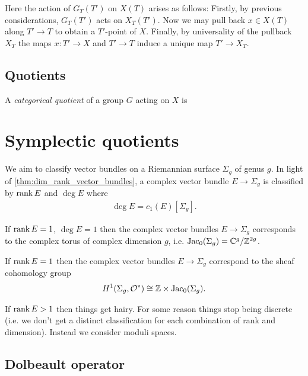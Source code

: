 \documentclass{article}
\begin{document}
Here the action of $G_T(T')$ on $X(T)$ arises as follows:
Firstly, by previous considerations, $G_T(T')$ acts on $X_T(T')$.
Now we may pull back $x\in X(T)$ along $T'\to T$ to obtain a
$T'$-point of $X$. Finally, by universality of the pullback
$X_T$ the maps $x:T'\to X$ and $T'\to T$ induce a unique map
$T'\to X_T$.

\subsection{Quotients}

\begin{definition}
  A \emph{categorical quotient} of a group $G$ acting on $X$
  is
\end{definition}

\section{Symplectic quotients}

We aim to classify vector bundles on a Riemannian surface $\Sigma_g$
of genus $g$. In light of \ref{thm:dim_rank_vector_bundles},
a complex vector bundle $E\to\Sigma_g$ is classified by
$\operatorname{rank} E$ and $\deg E$ where 
\begin{align*}
  \deg E = c_1(E)[\Sigma_g].
\end{align*}

If $\operatorname{rank} E = 1$, $\deg E = 1$ then the complex vector bundles
$E\to\Sigma_g$ corresponds to the complex torus of complex dimension
$g$, i.e. $\operatorname{Jac}_0(\Sigma_g)=\mathbb{C}^g / \mathbb{Z}^{2g}$.

If $\operatorname{rank} E = 1$ then the complex vector bundles $E\to\Sigma_g$
correspond to the sheaf cohomology  group
\begin{align*}
  H^1(\Sigma_g,\mathcal O^*) \cong \mathbb{Z}\times\operatorname{Jac}_0(\Sigma_g).
\end{align*}

If $\operatorname{rank} E>1$ then things get hairy. For some reason 
things stop being discrete (i.e. we don't get a distinct classification
for each combination of rank and dimension). Instead we consider
moduli spaces.

\subsection{Dolbeault operator}
\end{document}
